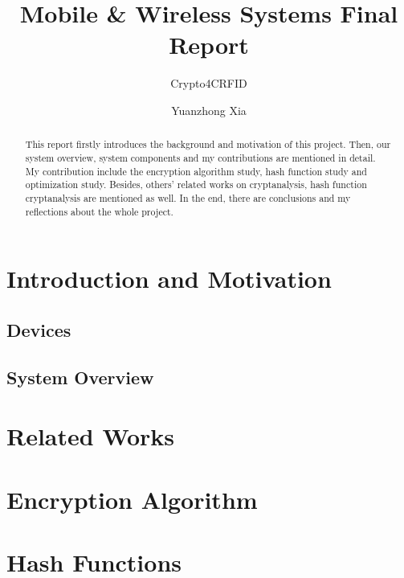 \documentclass[sigconf, review=false]{acmart}
\begin{document}
\title{Mobile \& Wireless Systems Final Report}
\subtitle{Crypto4CRFID}

\author{Yuanzhong Xia}

\begin{abstract}
    This report firstly introduces the background and motivation of this project.
    Then, our system overview, system components and my contributions are mentioned in detail.
    My contribution include the encryption algorithm study, hash function study and optimization study.
    Besides, others' related works on cryptanalysis, hash function cryptanalysis are mentioned as well.
    In the end, there are conclusions and my reflections about the whole project.
\end{abstract}
\maketitle



\section{Introduction and Motivation}

\subsection{Devices}

\subsection{System Overview}


\section{Related Works}


\section{Encryption Algorithm}


\section{Hash Functions}
\end{document}
